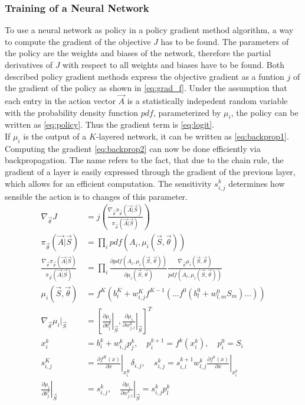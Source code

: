 \subsubsection{Training of a Neural Network}
To use a neural network as policy in a policy gradient method algorithm, a way to compute the gradient of the objective $J$ has to be found. The parameters of the policy are the weights and biases of the network, therefore the partial derivatives of $J$ with respect to all weights and biases have to be found. Both described policy gradient methods express the objective gradient as a funtion $j$ of the gradient of the policy as shown in \eqref{eq:grad_f}. Under the assumption that each entry in the action vector $\vec{A}$ is a statistically indepedent random variable with the probability density function $pdf$, parameterized by $\mu_i$, the policy can be written as \eqref{eq:policy}. Thus the gradient term is \eqref{eq:logit}. \cite[p. 335]{sutton_reinforcement_2018}\\
If $\mu_i$ is the output of a $K$-layered network, it can be written as \eqref{eq:backprop1}.
Computing the gradient \eqref{eq:backprop2} can now be done efficiently via backpropagation. The name refers to the fact, that due to the chain rule, the gradient of a layer is easily expressed through the gradient of the previous layer, which allows for an efficient computation. The sensitivity $s^k_{i,j}$ determines how sensible the action is to changes of this parameter. \cite[p.11-7 - 11-13]{demuth_neural_2014}
\begin{align}
	\nabla_{\vec{\theta}} J &= j\left(\frac{\nabla_{\vec{\theta}}\pi_{\vec{\theta}}(\vec{A}|\vec{S})} {\pi_{\vec{\theta}}(\vec{A}|\vec{S})}\right) \label{eq:grad_f}\\
	\pi_{\vec{\theta}}(\vec{A}|\vec{S}) &= \prod_i pdf(A_i, \mu_i(\vec{S},\vec{\theta})) \label{eq:policy}\\	\frac{\nabla_{\vec{\theta}}\pi_{\vec{\theta}}(\vec{A}|\vec{S})} {\pi_{\vec{\theta}}(\vec{A}|\vec{S})} &= \prod_i \frac{\partial pdf(A_i, \mu_i(\vec{S},\vec{\theta}))}{\partial \mu_i(\vec{S}, \vec{\theta})} \frac{\nabla_{\vec{\theta}} \mu_i(\vec{S},\vec{\theta})}{pdf(A_i, \mu_i(\vec{S}, \vec{\theta}))} \label{eq:logit}\\
	\mu_i(\vec{S}, \vec{\theta}) &= f^K ( b^K_i+w^K_{i,j} f^{K-1} (...f^{0}(b^0_l + w^0_{l,m}S_m)...)) \label{eq:backprop1} \\
	\nabla_{\vec{\theta}} \mu_i |_{\vec{S}} &= \left[\left. \frac{\partial \mu_i}{\partial b^k_j} \right|_{\vec{S}}, 
	\left.\frac{\partial \mu_i}{\partial w^k_{j,l}}\right|_{\vec{S}} \right]^T \label{eq:backprop2}\\
	x^k_i &= b^{k}_i + w^{k}_{i,j}p^k_j, \quad p^{k+1}_i = f^k(x^k_i), \quad p^0_i = S_i \\
	s^K_{i,j} &= \left.\frac{\partial f^K(x)}{\partial x}\right|_{x^K_i} \delta_{i,j}, \quad \left.s^{k}_{i,j} = s^{k+1}_{i,l} w^k_{l,j} \frac{\partial f^k(x)}{\partial x}\right|_{x^k_i} \\
	\left. \frac{\partial \mu_i}{\partial b^k_j}\right|_{\vec{S}} &= s^k_{i,j}, \quad \left. \frac{\partial \mu_i}{\partial w^k_{j,l}} \right|_{\vec{S}} = s^k_{i,j} p^k_l
\end{align}
